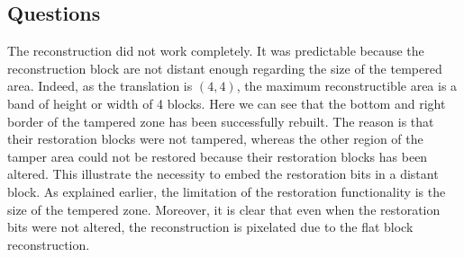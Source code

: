 \documentclass[11pt, oneside]{article}   	%
\begin{document}
\subsection{Questions}
The reconstruction did not work completely. It was predictable because the reconstruction block are not distant enough regarding the size of the tempered area. Indeed, as the translation is \((4,4)\), the maximum reconstructible area is a band of height or width of 4 blocks. \newline
Here we can see that the bottom and right border of the tampered zone has been successfully rebuilt. The reason is that their restoration blocks were not tampered, whereas the other region of the tamper area could not be restored because their restoration blocks has been altered. This illustrate the necessity to embed the restoration bits in a distant block.\newline
As explained earlier, the limitation of the restoration functionality is the size of the tempered zone. Moreover, it is clear that even when the restoration bits were not altered, the reconstruction is pixelated due to the flat block reconstruction.
\end{document}
